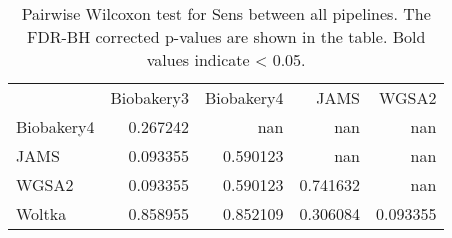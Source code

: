 \begin{table}
\caption{Pairwise Wilcoxon test for Sens between all pipelines. The FDR-BH corrected p-values are shown in the table. Bold values indicate < 0.05.}
\label{tab:pairwise_Sens}
\begin{tabular}{lrrrr}
 & Biobakery3 & Biobakery4 & JAMS & WGSA2 \\
Biobakery4 & 0.267242 & nan & nan & nan \\
JAMS & 0.093355 & 0.590123 & nan & nan \\
WGSA2 & 0.093355 & 0.590123 & 0.741632 & nan \\
Woltka & 0.858955 & 0.852109 & 0.306084 & 0.093355 \\
\end{tabular}
\end{table}
